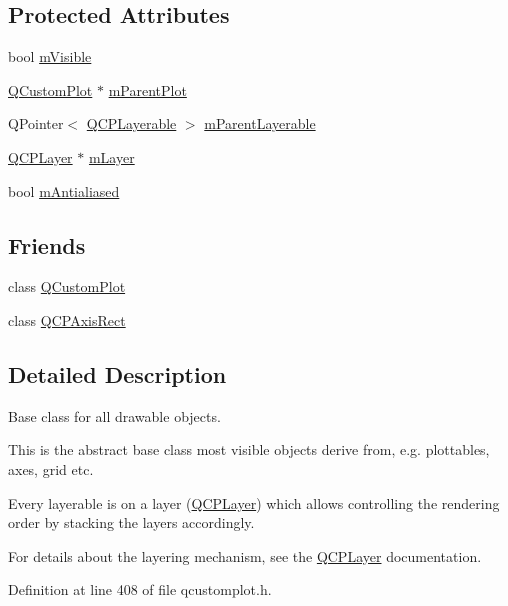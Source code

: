\subsection*{Protected Attributes}
\begin{DoxyCompactItemize}
\item 
bool \hyperlink{class_q_c_p_layerable_a62e3aed8427d6ce3ccf716f285106cb3}{m\+Visible}
\item 
\hyperlink{class_q_custom_plot}{Q\+Custom\+Plot} $\ast$ \hyperlink{class_q_c_p_layerable_aa2a528433e44db02b8aef23c1f9f90ed}{m\+Parent\+Plot}
\item 
Q\+Pointer$<$ \hyperlink{class_q_c_p_layerable}{Q\+C\+P\+Layerable} $>$ \hyperlink{class_q_c_p_layerable_a3291445a980053e2d17a21d15957624e}{m\+Parent\+Layerable}
\item 
\hyperlink{class_q_c_p_layer}{Q\+C\+P\+Layer} $\ast$ \hyperlink{class_q_c_p_layerable_aa38ec5891aff0f50b36fd63e9372a0cd}{m\+Layer}
\item 
bool \hyperlink{class_q_c_p_layerable_a3ab45a4c76a3333ce42eb217a81733ec}{m\+Antialiased}
\end{DoxyCompactItemize}
\subsection*{Friends}
\begin{DoxyCompactItemize}
\item 
class \hyperlink{class_q_c_p_layerable_a1cdf9df76adcfae45261690aa0ca2198}{Q\+Custom\+Plot}
\item 
class \hyperlink{class_q_c_p_layerable_acbf20ecb140f66c5fd1bc64ae0762990}{Q\+C\+P\+Axis\+Rect}
\end{DoxyCompactItemize}


\subsection{Detailed Description}
Base class for all drawable objects. 

This is the abstract base class most visible objects derive from, e.\+g. plottables, axes, grid etc.

Every layerable is on a layer (\hyperlink{class_q_c_p_layer}{Q\+C\+P\+Layer}) which allows controlling the rendering order by stacking the layers accordingly.

For details about the layering mechanism, see the \hyperlink{class_q_c_p_layer}{Q\+C\+P\+Layer} documentation. 

Definition at line 408 of file qcustomplot.\+h.



